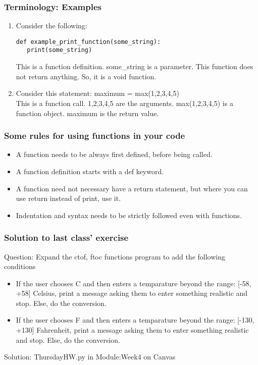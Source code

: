 \documentclass{beamer}
\begin{document}
\begin{frame}[fragile]
\frametitle{Terminology: Examples}
\begin{enumerate}
\item Consider the following: 
 \begin{verbatim}
def example_print_function(some_string):
   print(some_string)
  \end{verbatim}
This is a function definition. some\_string is a parameter. This function does not return anything. So, it is a void function. 
\pause
\item Consider this statement: maximum = max(1,2,3,4,5) \\
This is a function call. 1,2,3,4,5 are the arguments. max(1,2,3,4,5) is a function object. maximum is the return value.
\end{enumerate}
\end{frame}

\begin{frame}
\frametitle{Some rules for using functions in your code}
\begin{itemize}
\item A function needs to be always first defined, before being called.
\item A function definition starts with a def keyword. 
\item A function need not necessary have a return statement, but where you can use return instead of print, use it.
\item Indentation and syntax needs to be strictly followed even with functions.
\end{itemize}
\end{frame}

\begin{frame}
\frametitle{Solution to last class' exercise}
Question: Expand the ctof, ftoc functions program to add the following conditions
\begin{itemize}
\item If the user chooses C and then enters a temparature beyond the range: [-58, +58] Celsius, print a message asking them to enter something realistic and stop. Else, do the conversion.
\item If the user chooses F and then enters a temparature beyond the range: [-130, +130] Fahrenheit, print a message asking them to enter something realistic and stop. Else, do the conversion.
\end{itemize}
Solution: ThursdayHW.py in Module:Week4 on Canvas
\end{frame}
\end{document}
